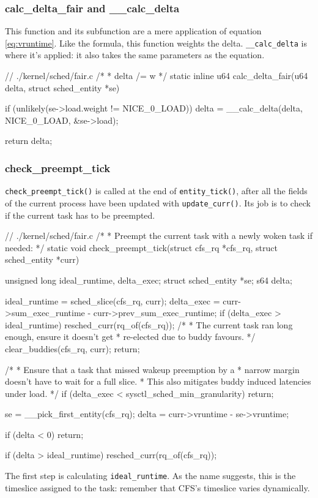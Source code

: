 \subsubsection{calc\_delta\_fair and \_\_calc\_delta}
This function and its subfunction are a mere application of equation \ref{eq:vruntime}. Like the formula, this function weights the delta. \verb|__calc_delta| is where it's applied: it also takes the same parameters as the equation. 
\begin{code}
// ./kernel/sched/fair.c
/*
 * delta /= w
 */
static inline u64 calc_delta_fair(u64 delta, struct sched_entity *se)
{
	if (unlikely(se->load.weight != NICE_0_LOAD))
		delta = __calc_delta(delta, NICE_0_LOAD, &se->load);

	return delta;
}
\end{code}
\subsubsection{check\_preempt\_tick}

\verb|check_preempt_tick()| is called at the end of \verb|entity_tick()|, after all the fields of the current process have been updated with \verb|update_curr()|. Its job is to check if the current task has to be preempted. 
\begin{code}
// ./kernel/sched/fair.c
/*
 * Preempt the current task with a newly woken task if needed:
 */
static void
check_preempt_tick(struct cfs_rq *cfs_rq, struct sched_entity *curr)
{
	unsigned long ideal_runtime, delta_exec;
	struct sched_entity *se;
	s64 delta;

	ideal_runtime = sched_slice(cfs_rq, curr);
	delta_exec = curr->sum_exec_runtime - curr->prev_sum_exec_runtime;
	if (delta_exec > ideal_runtime) {
		resched_curr(rq_of(cfs_rq));
		/*
		 * The current task ran long enough, ensure it doesn't get
		 * re-elected due to buddy favours.
		 */
		clear_buddies(cfs_rq, curr);
		return;
	}

	/*
	 * Ensure that a task that missed wakeup preemption by a
	 * narrow margin doesn't have to wait for a full slice.
	 * This also mitigates buddy induced latencies under load.
	 */
	if (delta_exec < sysctl_sched_min_granularity)
		return;

	se = __pick_first_entity(cfs_rq);
	delta = curr->vruntime - se->vruntime;

	if (delta < 0)
		return;

	if (delta > ideal_runtime)
		resched_curr(rq_of(cfs_rq));
}
\end{code}
The first step is calculating \verb|ideal_runtime|. As the name suggests, this is the timeslice assigned to the task: remember that CFS's timeslice varies dynamically.

